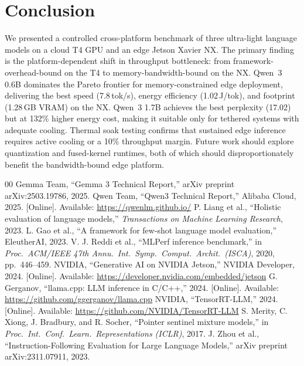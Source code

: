 \documentclass[conference]{IEEEtran}
\begin{document}
\section{Conclusion}
We presented a controlled cross-platform benchmark of three ultra-light language models on a cloud T4 GPU and an edge Jetson Xavier NX. The primary finding is the platform-dependent shift in throughput bottleneck: from framework-overhead-bound on the T4 to memory-bandwidth-bound on the NX. Qwen~3 0.6B dominates the Pareto frontier for memory-constrained edge deployment, delivering the best speed (7.8\,tok/s), energy efficiency (1.02\,J/tok), and footprint (1.28\,GB VRAM) on the NX. Qwen~3 1.7B achieves the best perplexity (17.02) but at 132\% higher energy cost, making it suitable only for tethered systems with adequate cooling. Thermal soak testing confirms that sustained edge inference requires active cooling or a 10\% throughput margin. Future work should explore quantization and fused-kernel runtimes, both of which should disproportionately benefit the bandwidth-bound edge platform.

\begin{thebibliography}{00}
 Gemma Team, ``Gemma 3 Technical Report,'' arXiv preprint arXiv:2503.19786, 2025.
 Qwen Team, ``Qwen3 Technical Report,'' Alibaba Cloud, 2025. [Online]. Available: \url{https://qwenlm.github.io/}
 P. Liang et al., ``Holistic evaluation of language models,'' \emph{Transactions on Machine Learning Research}, 2023.
 L. Gao et al., ``A framework for few-shot language model evaluation,'' EleutherAI, 2023.
 V. J. Reddi et al., ``MLPerf inference benchmark,'' in \emph{Proc.\ ACM/IEEE 47th Annu.\ Int.\ Symp.\ Comput.\ Archit.\ (ISCA)}, 2020, pp.~446--459.
 NVIDIA, ``Generative AI on NVIDIA Jetson,'' NVIDIA Developer, 2024. [Online]. Available: \url{https://developer.nvidia.com/embedded/jetson}
 G. Gerganov, ``llama.cpp: LLM inference in C/C++,'' 2024. [Online]. Available: \url{https://github.com/ggerganov/llama.cpp}
 NVIDIA, ``TensorRT-LLM,'' 2024. [Online]. Available: \url{https://github.com/NVIDIA/TensorRT-LLM}
 S. Merity, C. Xiong, J. Bradbury, and R. Socher, ``Pointer sentinel mixture models,'' in \emph{Proc.\ Int.\ Conf.\ Learn.\ Representations (ICLR)}, 2017.
 J. Zhou et al., ``Instruction-Following Evaluation for Large Language Models,'' arXiv preprint arXiv:2311.07911, 2023.
\end{thebibliography}
\end{document}
